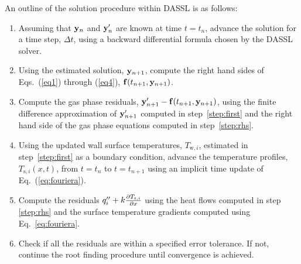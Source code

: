\documentclass[12pt,twoside]{book}
\begin{document}
An outline of the solution procedure within DASSL is as follows:
\begin{enumerate}
\item Assuming that $\mathbf{y}_n$ and $\mathbf{y}'_n$ are known at time $t=t_n$, advance the solution for a time step, $\Delta t$, using a backward differential formula chosen by the DASSL solver.
\label{step:first}
\item Using the estimated solution, $\mathbf{y}_{n+1}$, compute the right hand sides of Eqs.~(\ref{eq1}) through (\ref{eq4}), $\mathbf{f}(t_{n+1},\mathbf{y}_{n+1})$.
\label{step:rhs}
\item Compute the gas phase residuals, $\mathbf{y}'_{n+1}-\mathbf{f}(t_{n+1},\mathbf{y}_{n+1})$, using the finite difference approximation of $\mathbf{y}'_{n+1}$ computed in step~\ref{step:first} and the right hand side of the gas phase equations computed in step~\ref{step:rhs}.
\label{step:residode}
\item Using the updated wall surface temperatures, $T_{{\mathrm{w}},i}$, estimated in step~\ref{step:first} as a boundary condition, advance the temperature profiles, $T_{{\mathrm{s}},i}(x,t)$, from $t=t_n$ to $t=t_{n+1}$ using an implicit time update of Eq.~(\ref{eq:fouriera}).
\item Compute the residuals $q_i''+k\frac{\partial {T_{{\mathrm{s}},i}}}{\partial x}$ using the heat flows computed in step \ref{step:rhs} and the surface temperature gradients computed using Eq.~\ref{eq:fouriera}.
\item Check if all the residuals are within a specified error tolerance. If not, continue the root finding procedure until convergence is achieved.
\end{enumerate}


\label{last_page}
\end{document}
